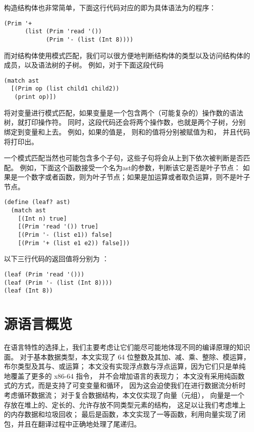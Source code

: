 构造结构体也非常简单，下面这行代码对应的即为具体语法为的程序：
\begin{lstlisting}
(Prim '+
      (list (Prim 'read '())
            (Prim '- (list (Int 8))))
\end{lstlisting}

而对结构体使用模式匹配，我们可以很方便地判断结构体的类型以及访问结构体的成员，以及语法树的子树。
例如，对于下面这段代码
\begin{lstlisting}
(match ast
  [(Prim op (list child1 child2))
   (print op)])
\end{lstlisting}
将对变量进行模式匹配，如果变量是一个包含两个（可能复杂的）操作数的语法树，就打印操作符。
同时，这段代码还会将两个操作数，也就是两个子树，分别绑定到变量和上去。
例如，如果的值是，
则和的值将分别被赋值为和，
并且代码将打印出\code{+}。

一个模式匹配当然也可能包含多个子句，这些子句将会从上到下依次被判断是否匹配。
例如，下面这个函数接受一个名为ast的参数，判断该它是否是叶子节点：
如果是一个数字或者函数，则为叶子节点；如果是加运算或者取负运算，则不是叶子节点。
\begin{lstlisting}
(define (leaf? ast)
  (match ast
    [(Int n) true]
    [(Prim 'read '()) true]
    [(Prim '- (list e1)) false]
    [(Prim '+ (list e1 e2)) false]))
\end{lstlisting}

以下三行代码的返回值将分别为 ：
\begin{lstlisting}
(leaf (Prim 'read '()))
(leaf (Prim '- (list (Int 8))))
(leaf (Int 8))
\end{lstlisting}

\section{源语言概览}

在语言特性的选择上，我们主要考虑让它们能尽可能地体现不同的编译原理的知识面。
对于基本数据类型，本文实现了 64 位整数及其加、减、乘、整除、模运算，布尔类型及其与、或运算；
本文没有实现浮点数与浮点运算，因为它们只是单纯地覆盖了更多的 x86-64 指令，
并不会增加语言的表现力；
本文没有采用纯函数式的方式，而是支持了可变变量和循环，
因为这会迫使我们在进行数据流分析时考虑循环数据流；
对于复合数据结构，本文仅实现了向量（元组），
向量是一个存放在堆上的、定长的、允许存放不同类型元素的结构，
这足以让我们考虑堆上的内存数据和垃圾回收；
最后是函数，本文实现了一等函数，利用向量实现了闭包，并且在翻译过程中正确地处理了尾递归。

